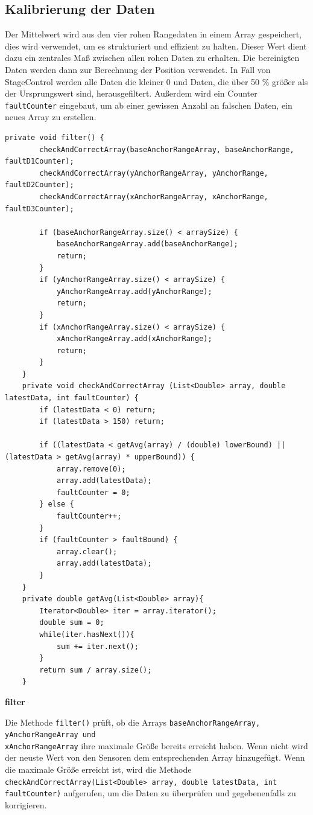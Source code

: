 \subsection{Kalibrierung der Daten}
\label{KalibrierungDerDaten}
Der Mittelwert wird aus den vier rohen Rangedaten in einem Array gespeichert, dies wird verwendet, um es strukturiert und effizient zu halten. Dieser Wert dient dazu ein zentrales Maß zwischen allen rohen Daten zu erhalten. Die bereinigten Daten werden dann zur Berechnung der Position verwendet. In Fall von StageControl werden alle Daten die kleiner 0 und Daten, die über 50 \% größer als der Ursprungswert sind, herausgefiltert. Außerdem wird ein Counter \texttt{faultCounter} eingebaut, um ab einer gewissen Anzahl an falschen Daten, ein neues Array zu erstellen. 
\newpage
\begin{lstlisting}[style=Java, caption=Kalibrierung der Daten, captionpos=b]
	private void filter() {
		checkAndCorrectArray(baseAnchorRangeArray, baseAnchorRange, faultD1Counter);
		checkAndCorrectArray(yAnchorRangeArray, yAnchorRange, faultD2Counter);
		checkAndCorrectArray(xAnchorRangeArray, xAnchorRange, faultD3Counter);
		
		if (baseAnchorRangeArray.size() < arraySize) {
			baseAnchorRangeArray.add(baseAnchorRange);
			return;
		}
		if (yAnchorRangeArray.size() < arraySize) {
			yAnchorRangeArray.add(yAnchorRange);
			return;
		}
		if (xAnchorRangeArray.size() < arraySize) {
			xAnchorRangeArray.add(xAnchorRange);
			return;
		}
	}
	private void checkAndCorrectArray (List<Double> array, double latestData, int faultCounter) {
		if (latestData < 0) return;
		if (latestData > 150) return;
		
		if ((latestData < getAvg(array) / (double) lowerBound) || (latestData > getAvg(array) * upperBound)) {
			array.remove(0);
			array.add(latestData);
			faultCounter = 0;
		} else {
			faultCounter++;
		}
		if (faultCounter > faultBound) {
			array.clear();
			array.add(latestData);
		}
	}
	private double getAvg(List<Double> array){
		Iterator<Double> iter = array.iterator();
		double sum = 0;
		while(iter.hasNext()){
			sum += iter.next();
		}
		return sum / array.size();
	}
\end{lstlisting}

\textbf{filter}

Die Methode \texttt{filter()} prüft, ob die Arrays \texttt{baseAnchorRangeArray, yAnchorRangeArray und \\ xAnchorRangeArray} ihre maximale Größe bereits erreicht haben. Wenn nicht wird der neuste Wert von den Sensoren dem entsprechenden Array hinzugefügt. Wenn die maximale Größe erreicht ist, wird die Methode \\ \texttt{checkAndCorrectArray(List<Double> array, double latestData, int faultCounter)} aufgerufen, um die Daten zu überprüfen und gegebenenfalls zu korrigieren.

